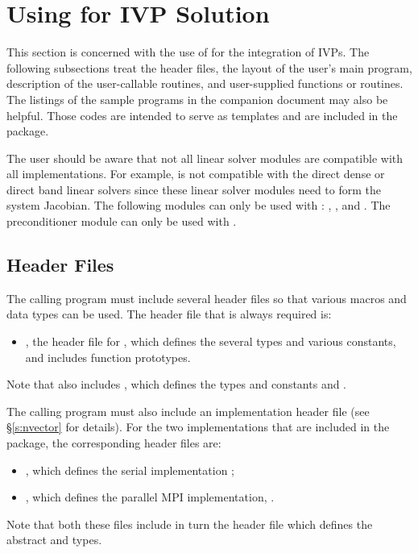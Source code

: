 \chapter{Using {\cvodes} for IVP Solution}\label{s:simulation}

This section is concerned with the use of {\cvodes} for the integration of IVPs.
The following subsections treat the header files, the layout of the user's main
program, description of the {\cvodes} user-callable routines, and user-supplied functions 
or routines. 
The listings of the sample programs in the companion document \cite{} may also be helpful. 
Those codes are intended to serve as templates and are included in the {\cvodes} package.

The user should be aware that not all linear solver modules are compatible 
with all {\nvector} implementations. 
For example, {\nvecp} is not compatible with the direct dense or direct band 
linear solvers since these linear solver modules need to form the system Jacobian.
The following {\cvodes} modules can only be used with {\nvecs}:
{\cvdense}, {\cvband}, and {\cvbandpre}. The preconditioner module {\cvbbdpre}
can only be used with {\nvecp}. 

\section{Header Files}\label{ss:header_sim}

The calling program must include several header files so that various macros
and data types can be used. The header file that is always required is:
%
\begin{itemize}
\item  {}, 
  the header file for {\cvodes}, which defines the several
  types and various constants, and includes function prototypes.
\end{itemize}
%
Note that  also includes , 
which defines the types 
and constants  and .

The calling program must also include an {\nvector} implementation header file
(see \S\ref{s:nvector} for details).
For the two {\nvector} implementations that are included in the {\cvodes} package,
the corresponding header files are:
%
\begin{itemize}
\item {}, 
  which defines the serial implementation {\nvecs};
\item {}, 
  which defines the parallel MPI implementation, {\nvecp}.
\end{itemize}
%
Note that both these files include in turn the header file  which 
defines the abstract  and  types. 

